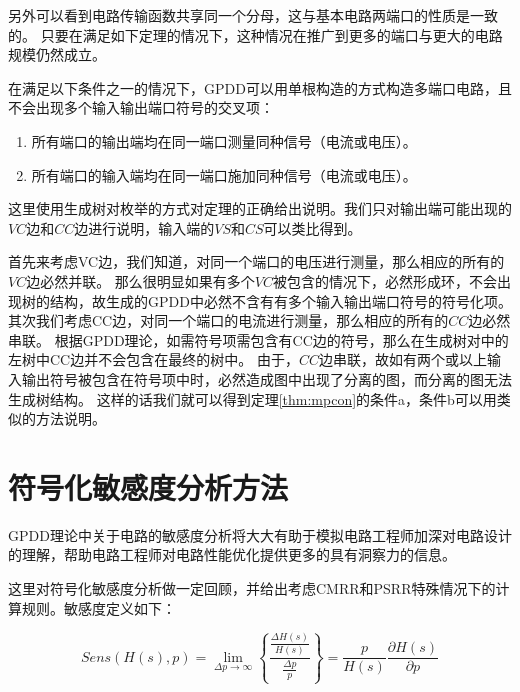 另外可以看到电路传输函数共享同一个分母，这与基本电路两端口的性质是一致的。
只要在满足如下定理的情况下，这种情况在推广到更多的端口与更大的电路规模仍然成立。

\begin{thm}\label{thm:mpcon}
	在满足以下条件之一的情况下，GPDD可以用单根构造的方式构造多端口电路，且不会出现多个输入输出端口符号的交叉项：
	\begin{enumerate}[label=\emph{\alph*})]
		\item 所有端口的输出端均在同一端口测量同种信号（电流或电压）。
		\item 所有端口的输入端均在同一端口施加同种信号（电流或电压）。
	\end{enumerate}
\end{thm}

这里使用生成树对枚举的方式对定理的正确给出说明。我们只对输出端可能出现的$VC$边和$CC$边进行说明，输入端的$VS$和$CS$可以类比得到。

首先来考虑VC边，我们知道，对同一个端口的电压进行测量，那么相应的所有的$VC$边必然并联。
那么很明显如果有多个$VC$被包含的情况下，必然形成环，不会出现树的结构，故生成的GPDD中必然不含有有多个输入输出端口符号的符号化项。
其次我们考虑CC边，对同一个端口的电流进行测量，那么相应的所有的$CC$边必然串联。
根据GPDD理论\parencite{GShi-GPDD}，如需符号项需包含有CC边的符号，那么在生成树对中的左树中CC边并不会包含在最终的树中。
由于，$CC$边串联，故如有两个或以上输入输出符号被包含在符号项中时，必然造成图中出现了分离的图，而分离的图无法生成树结构。
这样的话我们就可以得到定理\ref{thm:mpcon}的条件a，条件b可以用类似的方法说明。

\section{符号化敏感度分析方法}

GPDD理论中关于电路的敏感度分析将大大有助于模拟电路工程师加深对电路设计的理解，帮助电路工程师对电路性能优化提供更多的具有洞察力的信息\parencite{MengXiaoxuan-Sens-2009,WengBinbin-Sens-2011,ChenJiajun-Sens-2012}。

这里对符号化敏感度分析做一定回顾，并给出考虑CMRR和PSRR特殊情况下的计算规则。敏感度定义如下：

\begin{equation}
Sens\left( {H\left( s \right),p} \right) = \mathop {\lim }\limits_{\Delta p \to \infty } \left\{ {\frac{{\frac{{\Delta H\left( s \right)}}{{H\left( s \right)}}}}{{\frac{{\Delta p}}{p}}}} \right\} = \frac{p}{{H\left( s \right)}}\frac{{\partial H\left( s \right)}}{{\partial p}}
\end{equation}

